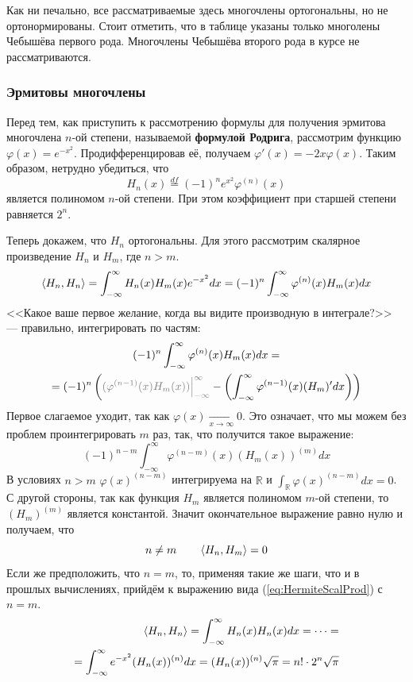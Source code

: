 \documentclass[12pt]{article}
\begin{document}
	Как ни печально, все рассматриваемые здесь многочлены ортогональны, но не ортонормированы.
	Стоит отметить, что в таблице указаны только многолены Чебышёва первого рода. Многочлены Чебышёва второго рода в курсе 
	не рассматриваются.
	
	\subsubsection{Эрмитовы многочлены}
	
	Перед тем, как приступить к рассмотрению формулы для получения эрмитова многочлена $n$-ой степени, называемой 
	\textbf{формулой Родрига}, рассмотрим функцию $\varphi(x) = e^{-x^2}$. Продифференцировав её, получаем 
	$\varphi'(x) = -2x \varphi(x)$. Таким образом, нетрудно убедиться, что
	$$H_n(x) \overset{df}{=} (-1)^n e^{x^2} \varphi^{(n)} (x)$$
	является полиномом $n$-ой степени. При этом коэффициент при старшей степени равняется $2^n$.
	
	Теперь докажем, что $H_n$ ортогональны. Для этого рассмотрим скалярное произведение $H_n$ и $H_m$, где $n > m$.
	$$\left\langle H_n, H_n \right\rangle = \int_{-\infty}^{\infty} H_n(x) H_m(x) e^{-x^2} dx = (-1)^n \int_{-\infty}^{\infty} \varphi^{(n)}(x) H_m(x) dx$$
	<<Какое ваше первое желание, когда вы видите производную в интеграле?>> --- правильно, интегрировать по частям:
	\begin{gather*}
		(-1)^n \int_{-\infty}^{\infty} \varphi^{(n)}(x) H_m(x) dx = \\
		= (-1)^n \left( {\color{gray}(\varphi^{(n-1)}(x) H_m(x)) \lims{-\infty}{\infty}}
		- \left(\int_{-\infty}^{\infty} \varphi^{(n-1)}(x) (H_m)' dx \right) \right)
	\end{gather*}
	Первое слагаемое уходит, так как $\varphi(x) \underset{x \rightarrow \infty}{\rightarrow} 0$. Это означает, что мы можем без проблем
	проинтегрировать $m$ раз, так, что получится такое выражение:
	\begin{equation} \label{eq:HermiteScalProd}
		(-1)^{n-m} \int_{-\infty}^{\infty} \varphi^{(n-m)}(x) (H_m(x))^{(m)} dx
	\end{equation}
	В условиях $n > m$ $\varphi(x)^{(n-m)}$ интегрируема на $\mathbb{R}$ и $\int_{\mathbb{R}} \varphi(x)^{(n-m)} dx = 0$. С другой 
	стороны, так как функция $H_m$ является полиномом $m$-ой степени, то $(H_m)^{(m)}$ является константой. Значит окончательное выражение
	равно нулю и получаем, что
	$$n \neq m \qquad \left\langle H_n, H_m \right\rangle = 0$$
	Если же предположить, что $n=m$, то, применяя такие же шаги, что и в прошлых вычислениях, прийдём к выражению вида 
	(\ref{eq:HermiteScalProd}) с $n=m$. 
	\begin{align*}
		\left\langle H_n, H_n \right\rangle = \int_{-\infty}^{\infty} H_n(x) H_n(x) dx = \dots = \\
		= \int_{-\infty}^{\infty} e^{-x^2} (H_n(x))^{(n)} dx = (H_n(x))^{(n)} \sqrt{\pi} = n! \cdot 2^n \sqrt{\pi}
	\end{align*}
	
\end{document}
